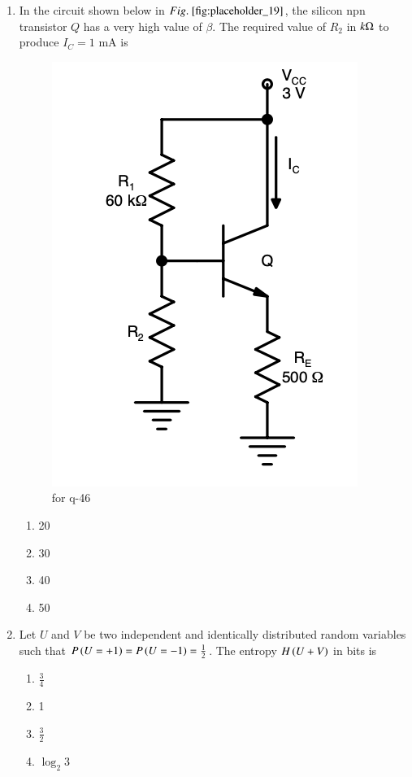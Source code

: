 \documentclass[journal,12pt,onecolumn]{IEEEtran}
\theoremstyle{remark}
\begin{document}
\begin{enumerate}
\item In the circuit shown  below in $\figref{fig:placeholder_19}$, the silicon npn transistor $Q$ has a very high value of $\beta$. The required value of $R_2$ in $k \ohm$ to produce $I_C = 1$ mA is
\begin{figure}[H]
    \centering
    \includegraphics[width=0.5\columnwidth]{figs/fig_19.png}
    \caption{for q-46}
    \label{fig:placeholder_19}
\end{figure}
\begin{multicols}{4}
\begin{enumerate}
\item 20
\item 30
\item 40
\item 50
\end{enumerate}
\end{multicols}
\hfill {}

\item Let $U$ and $V$ be two independent and identically distributed random variables such that $P\left(U = +1\right) = P\left(U = -1\right) = \frac{1}{2}$. The entropy $H\left(U + V\right)$ in bits is

\begin{multicols}{4}
\begin{enumerate}
\item $\frac{3}{4}$
\item 1
\item $\frac{3}{2}$
\item $\log_2 3$
\end{enumerate}
\end{multicols}
\hfill {}


\end{enumerate}
\end{document}
